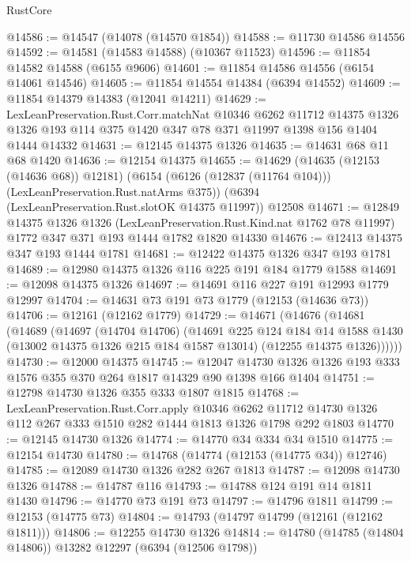 \begin{lexlean}{RustCore}
\begin{coremodule}
@14586 := @14547 (@14078 (@14570 @1854))
@14588 := @11730 @14586 @14556
@14592 := @14581 (@14583 @14588) (@10367 @11523)
@14596 := @11854 @14582 @14588 (@6155 @9606)
@14601 := @11854 @14586 @14556 (@6154 @14061 @14546)
@14605 := @11854 @14554 @14384 (@6394 @14552)
@14609 := @11854 @14379 @14383 (@12041 @14211)
@14629 := LexLeanPreservation.Rust.Corr.matchNat
    @10346
    @6262
    @11712
    @14375
    @1326
    @1326
    @193
    @114
    @375
    @1420
    @347
    @78
    @371
    @11997
    @1398
    @156
    @1404
    @1444
    @14332
@14631 := @12145 @14375 @1326
@14635 := @14631 @68 @11 @68 @1420
@14636 := @12154 @14375
@14655 := @14629
    (@14635 (@12153 (@14636 @68)) @12181)
    (@6154 (@6126 (@12837 (@11764 @104))) (LexLeanPreservation.Rust.natArms @375))
    (@6394 (LexLeanPreservation.Rust.slotOK @14375 @11997))
    @12508
@14671 := @12849
    @14375
    @1326
    @1326
    (LexLeanPreservation.Rust.Kind.nat @1762 @78 @11997)
    @1772
    @347
    @371
    @193
    @1444
    @1782
    @1820
    @14330
@14676 := @12413 @14375 @347 @193 @1444 @1781
@14681 := @12422 @14375 @1326 @347 @193 @1781
@14689 := @12980 @14375 @1326 @116 @225 @191 @184 @1779 @1588
@14691 := @12098 @14375 @1326
@14697 := @14691 @116 @227 @191 @12993 @1779 @12997
@14704 := @14631 @73 @191 @73 @1779 (@12153 (@14636 @73))
@14706 := @12161 (@12162 @1779)
@14729 := @14671
    (@14676
      (@14681
        (@14689
          (@14697
            (@14704 @14706)
            (@14691
              @225
              @124
              @184
              @14
              @1588
              @1430
              (@13002 @14375 @1326 @215 @184 @1587 @13014)
              (@12255 @14375 @1326))))))
@14730 := @12000 @14375
@14745 := @12047 @14730 @1326 @1326 @193 @333 @1576 @355 @370 @264 @1817 @14329 @90 @1398 @166 @1404
@14751 := @12798 @14730 @1326 @355 @333 @1807 @1815
@14768 := LexLeanPreservation.Rust.Corr.apply
    @10346
    @6262
    @11712
    @14730
    @1326
    @112
    @267
    @333
    @1510
    @282
    @1444
    @1813
    @1326
    @1798
    @292
    @1803
@14770 := @12145 @14730 @1326
@14774 := @14770 @34 @334 @34 @1510
@14775 := @12154 @14730
@14780 := @14768 (@14774 (@12153 (@14775 @34)) @12746)
@14785 := @12089 @14730 @1326 @282 @267 @1813
@14787 := @12098 @14730 @1326
@14788 := @14787 @116
@14793 := @14788 @124 @191 @14 @1811 @1430
@14796 := @14770 @73 @191 @73
@14797 := @14796 @1811
@14799 := @12153 (@14775 @73)
@14804 := @14793 (@14797 @14799 (@12161 (@12162 @1811)))
@14806 := @12255 @14730 @1326
@14814 := @14780 (@14785 (@14804 @14806)) @13282 @12297 (@6394 (@12506 @1798))

\end{coremodule}
\end{lexlean}
